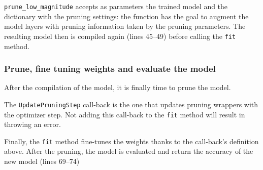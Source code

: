 \texttt{prune\_low\_magnitude} accepts as parameters the trained model and the
dictionary with the pruning settings: the function has the goal to augment the
model layers with pruning information taken by the pruning parameters.
The resulting model then is compiled again (lines 45--49) before calling the
\texttt{fit} method.

\subsubsection{Prune, fine tuning weights and evaluate the model}
After the compilation of the model, it is finally time to prune the model.

The \texttt{UpdatePruningStep} call-back is the one that updates pruning
wrappers with the optimizer step. Not adding this call-back to the \texttt{fit}
method will result in throwing an error.

Finally, the \texttt{fit} method fine-tunes the weights thanks to the
call-back's definition above.
After the pruning, the model is evaluated and return the accuracy of the new
model (lines 69--74)
